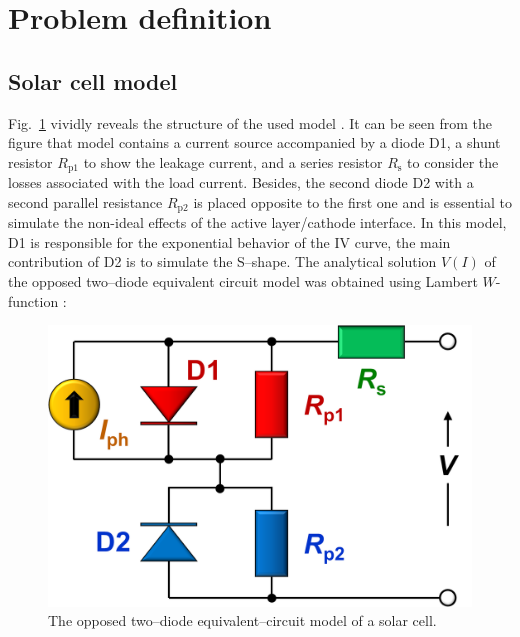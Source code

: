 \documentclass[a4paper,fleqn]{cas-dc}
\begin{document}
\cite{NFL}


\section{Problem definition}\label{MM}
\subsection{Solar cell model}\label{SCModel}
Fig.~\ref{fig_chem}
vividly reveals the structure of the used model \cite{Castro2010}.
It can be seen from the figure that model contains a current source accompanied by a diode D1, a shunt
resistor $R_\mathrm{p1}$ to show the leakage current, and a series resistor $R_\mathrm{s}$ to consider the
losses associated with the load current.
Besides, the second diode D2 with a second parallel resistance $R_\mathrm{p2}$ is placed opposite to the first one and is essential to
simulate the non-ideal effects of the active layer/cathode interface.
In this model, D1 is responsible for the exponential behavior of the IV curve,
the main contribution of D2 is to simulate the S--shape.
The analytical solution $V(I)$ of the opposed two--diode equivalent circuit model was
 obtained \cite{CastroSolution} using Lambert $W$-function \cite{LambertNew}:


\begin{figure}[]
	\centering
		\includegraphics[width=0.9\columnwidth]{Chem}
	  \caption{The opposed two--diode equivalent--circuit model of a solar cell.}\label{fig_chem}
\end{figure}
\end{document}

